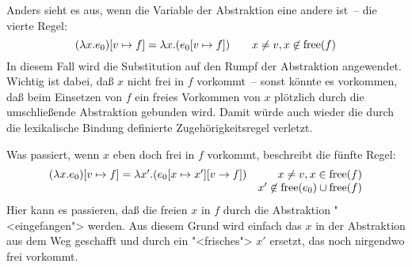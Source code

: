 Anders sieht es aus, wenn die Variable der Abstraktion eine andere
ist~-- die vierte Regel:
%
\begin{displaymath}
  (\lambda x.e_0)[v\mapsto f]  = \lambda x.(e_0[v\mapsto f])
  \qquad x\neq v, x\not\in\operatorname{free}(f)
\end{displaymath}
%
In diesem Fall wird die Substitution auf den Rumpf der Abstraktion
angewendet.  Wichtig ist dabei, daß $x$ nicht frei in $f$ vorkommt~-- sonst
könnte es vorkommen, daß beim Einsetzen von $f$ ein freies Vorkommen
von $x$ plötzlich durch die umschließende Abstraktion gebunden wird.
Damit würde auch wieder die durch die lexikalische Bindung definierte
Zugehörigkeitsregel verletzt.

Was passiert, wenn $x$ eben doch frei in $f$ vorkommt, beschreibt die
fünfte Regel:
%
\begin{displaymath}
  \begin{array}{lr}
      (\lambda x.e_0)[v\mapsto f] = \lambda x'.(e_0[x\mapsto x'][v\rightarrow f])
    & x\neq v, x\in\operatorname{free}(f)\\& x'\not\in\operatorname{free}(e_0)\cup\operatorname{free}(f)
  \end{array}
\end{displaymath}
%
Hier kann es passieren, daß die freien $x$ in $f$ durch die
Abstraktion "<eingefangen"> werden.  Aus diesem Grund wird einfach das
$x$ in der Abstraktion aus dem Weg geschafft und durch ein
"<frisches"> $x'$ ersetzt, das noch nirgendwo frei vorkommt.

